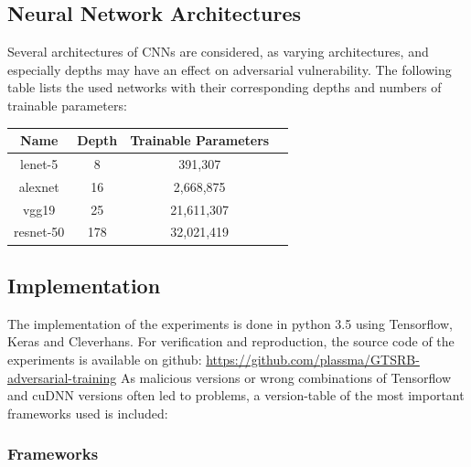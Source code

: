 \documentclass[draft,final]{vutinfth} %
\begin{document}

\subsection{Neural Network Architectures}

Several architectures of CNNs are considered, as varying architectures, and especially depths may have an effect on adversarial vulnerability.
The following table lists the used networks with their corresponding depths and numbers of trainable parameters:

\begin{table}[h]
  \centering
  \begin{tabular}{cccc}
    \toprule
		Name    		& Depth		& Trainable Parameters\\
    \midrule
		lenet-5			&	8				& 391,307							\\
		alexnet 		& 16			& 2,668,875						\\
		vgg19				& 25			& 21,611,307					\\
		resnet-50		& 178			& 32,021,419					\\
    
    \bottomrule
  \end{tabular}
\end{table}

\subsection{Implementation}

The implementation of the experiments is done in python 3.5 using Tensorflow, Keras and Cleverhans.
For verification and reproduction, the source code of the experiments is available on github: \url{https://github.com/plassma/GTSRB-adversarial-training}
As malicious versions or wrong combinations of Tensorflow and cuDNN versions often led to problems, a version-table of the most important frameworks used is included:

\subsubsection{Frameworks}
\end{document}
